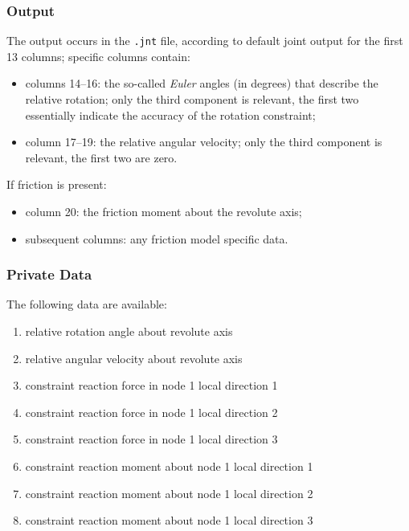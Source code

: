 \subsubsection{Output}
The output occurs in the \texttt{.jnt} file, according to default joint output
for the first 13 columns; specific columns contain:
\begin{itemize}
\item columns 14--16: the so-called \emph{Euler} angles (in degrees)
	that describe the relative rotation; only the third component
	is relevant, the first two essentially indicate the accuracy
	of the rotation constraint;
\item column 17--19: the relative angular velocity; only the third component
	is relevant, the first two are zero.
\end{itemize}
If friction is present:
\begin{itemize}
\item column 20: the friction moment about the revolute axis;
\item subsequent columns: any friction model specific data.
\end{itemize}

\subsubsection{Private Data}
The following data are available:
\begin{enumerate}
\item {} relative rotation angle about revolute axis
\item {} relative angular velocity about revolute axis
\item {} constraint reaction force in node 1 local direction 1
\item {} constraint reaction force in node 1 local direction 2
\item {} constraint reaction force in node 1 local direction 3
\item {} constraint reaction moment about node 1 local direction 1
\item {} constraint reaction moment about node 1 local direction 2
\item {} constraint reaction moment about node 1 local direction 3
\end{enumerate}

